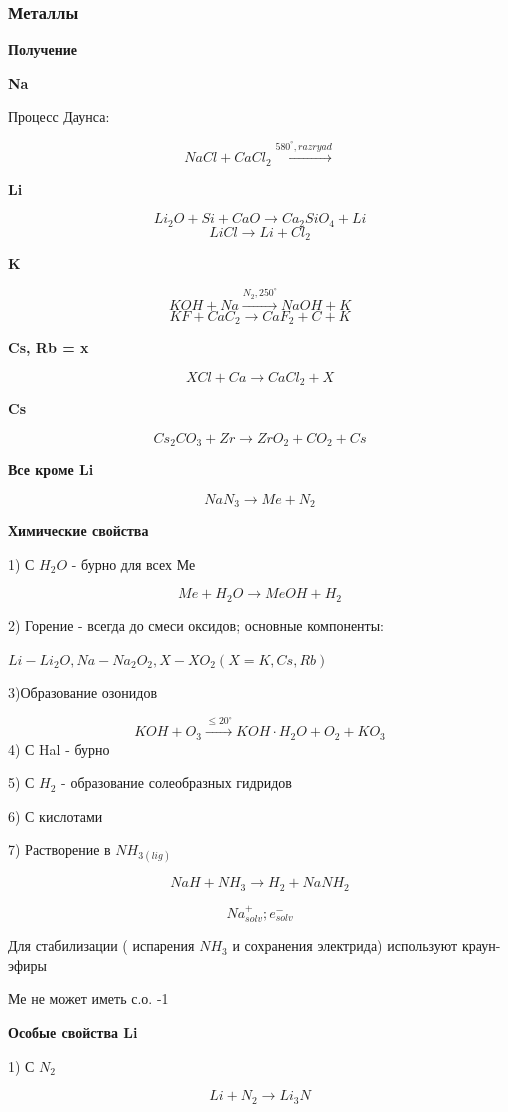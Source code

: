 \subsubsection*{Металлы}

\textbf{Получение}

\textbf{Na}

Процесс Даунса:

$$NaCl + CaCl_2 \xrightarrow{580^{\circ}, razryad}$$

\textbf{Li}

$$Li_2O + Si + CaO \rightarrow Ca_2SiO_4  + Li$$
$$LiCl \rightarrow Li + Cl_2$$

\textbf{K}

$$KOH + Na \xrightarrow{N_2, 250^{\circ}} NaOH + K$$
$$KF + CaC_2 \rightarrow CaF_2 + C + K$$

\textbf{Cs, Rb = x}

$$XCl + Ca \rightarrow CaCl_2 + X$$

\textbf{Cs}

$$Cs_2CO_3 + Zr \rightarrow ZrO_2 + CO_2 + Cs$$

\textbf{Все кроме Li}

$$NaN_3 \rightarrow Me + N_2$$

\textbf{Химические свойства}

1) С $H_2O$ - бурно для всех Ме

$$Me + H_2O \rightarrow MeOH + H_2$$

2) Горение - всегда до смеси оксидов; основные компоненты:

$Li-Li_2O, Na - Na_2O_2, X - XO_2 (X = K, Cs, Rb)$

3)Образование озонидов

$$KOH + O_3 \xrightarrow{\leq20^{\circ}} KOH\cdot H_2O + O_2 + KO_3$$
4) С Hal - бурно

5) С $H_2$ - образование солеобразных гидридов

6) С кислотами

7) Растворение в $NH_{3(lig)}$

$$NaH + NH_3 \rightarrow H_2 + NaNH_2$$

$$Na_{solv}^+; e_{solv}^-$$

Для стабилизации ( испарения $NH_3$ и сохранения электрида) используют краун-эфиры

Ме не может иметь с.о. -1

\textbf{Особые свойства Li}

1) С $N_2$

$$Li + N_2 \rightarrow Li_3N$$

